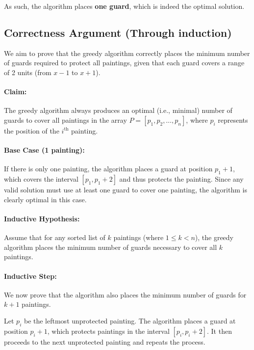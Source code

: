\documentclass[12pt]{article}
\begin{document}
As such, the algorithm places \textbf{one guard}, which is indeed the optimal solution.

\subsection*{Correctness Argument (Through induction)}

We aim to prove that the greedy algorithm correctly places the minimum number of guards required to protect all paintings, given that each guard covers a range of 2 units (from \( x - 1 \) to \( x + 1 \)).

\paragraph{Claim:}  
The greedy algorithm always produces an optimal (i.e., minimal) number of guards to cover all paintings in the array \( P = [p_1, p_2, \dots, p_n] \), where \( p_i \) represents the position of the \( i^{\text{th}} \) painting.

\paragraph{Base Case (1 painting):}  
If there is only one painting, the algorithm places a guard at position \( p_1 + 1 \), which covers the interval \( [p_1, p_1 + 2] \) and thus protects the painting. Since any valid solution must use at least one guard to cover one painting, the algorithm is clearly optimal in this case.

\paragraph{Inductive Hypothesis:}  
Assume that for any sorted list of \( k \) paintings (where \( 1 \leq k < n \)), the greedy algorithm places the minimum number of guards necessary to cover all \( k \) paintings.

\paragraph{Inductive Step:}  
We now prove that the algorithm also places the minimum number of guards for \( k + 1 \) paintings.

Let \( p_i \) be the leftmost unprotected painting.  
The algorithm places a guard at position \( p_i + 1 \), which protects paintings in the interval \( [p_i, p_i + 2] \). It then proceeds to the next unprotected painting and repeats the process.
\end{document}
